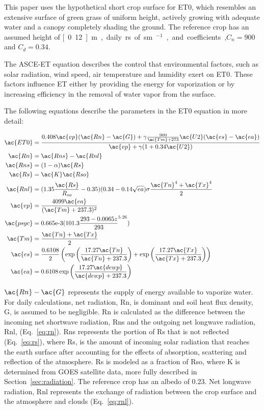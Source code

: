 \documentclass[reviewcopy]{elsart}
\begin{document}
This paper uses the hypothetical short crop surface for \ac{ET0},
which resembles an extensive surface of green grass of uniform height,
actively growing with adequate water and a canopy completely shading
the ground.  The reference crop has an assumed height of
\unit[0.12]{m}, daily \ac{rs} of \unit[70]{sm\ensuremath{^{-1}}}, and
coefficients,$C_n = 900$ and $C_d = 0.34$.

The \ac{ASCE-ET} equation describes the control that
environmental factors, such as solar radiation, wind speed, air
temperature and humidity exert on \ac{ET0}. These factors influence
\ac{ET} either by providing the energy for vaporization or by
increasing efficiency in the removal of water vapor from the surface.

The following equations describe the parameters in the \ac{ET0}
equation in more detail:

\begin{align}
  \ac{ET0} &= \frac{0.408  \ac{vp}  (\ac{Rn} - \ac{G}) + \gamma \frac{900}{ \ac{Tm} + 273} \ac{U2} (\ac{es} - \ac{ea})}{\ac{vp} + \gamma  (1 + 0.34 \ac{U2})} \label{eq:et0} \\
  \ac{Rn} &= \ac{Rns} - \ac{Rnl} \label{eq:rn} \\
  \ac{Rns} &= (1 - \alpha) \ac{Rs} \label{eq:rns}\\
  \ac{Rs} &= \ac{K} \ac{Rso} \label{eq:rs}\\
  \ac{Rnl} &= (1.35\frac{\ac{Rs}}{R_{so}}-0.35)(0.34-0.14\sqrt{ea})\sigma\frac{\ac{Tn}^4+\ac{Tx}^4}{2} \label{eq:rnl} \\
  \ac{vp}    &= \frac{4099  \ac{ea}}{ (\ac{Tm} + 237.3)^2} \label{eq:delta} \\
  \ac{psyc}&= 0.665\text{e-3}(101.3{\frac{293-0.0065z}{293}}^{5.26}) \\
  \ac{Tm}   &= \frac{\ac{Tn} + \ac{Tx}}{2} \label{eq:Tm}\\
  \ac{es}   &= \frac{0.6108}{2}  \left(\exp\left(\frac{17.27 \ac{Tn}}{\ac{Tn} + 237.3}\right) + \exp\left(\frac{17.27 \ac{Tx}}{\ac{Tx}+237.3}\right)\right) \label{eq:es}\\
  \ac{ea}  &= 0.6108 \exp\left(\frac{17.27 \ac{dewp}}{\ac{dewp} + 237.3}\right)\label{eq:eadewp}
\end{align}

$\ac{Rn}-\ac{G}$ represents the supply of energy available to vaporize
water.  For daily calculations, net radiation, \ac{Rn}, is dominant
and soil heat flux density, \ac{G}, is assumed to be negligible.
\ac{Rn} is calculated as the difference between the incoming net
shortwave radiation, \ac{Rns} and the outgoing net longwave radiation,
\ac{Rnl}, (Eq.~\ref{eq:rn}).  \ac{Rns} represents the portion of
\ac{Rs} that is not reflected (Eq.~\ref{eq:rs}), where \ac{Rs}, is the
amount of incoming solar radiation that reaches the earth surface
after accounting for the effects of absorption, scattering and
reflection of the atmosphere.  \ac{Rs} is modeled as
a fraction of \ac{Rso}, where \ac{K} is determined from \ac{GOES}
satellite data, more fully described in Section~\ref{sec:radiation}.
The reference crop has an albedo of 0.23.  Net longwave radiation,
\ac{Rnl} represents the exchange of radiation between the crop surface
and the atmosphere and clouds (Eq.~\ref{eq:rnl}).
\end{document}

